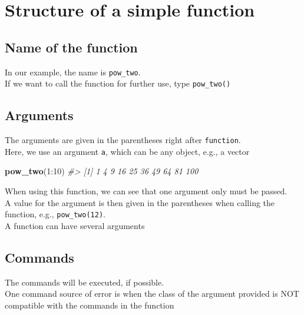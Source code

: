 \documentclass[]{book}
\newenvironment{Shaded}{}{}
\newcommand{\CommentTok}[1]{\textcolor[rgb]{0.38,0.63,0.69}{\textit{#1}}}
\newcommand{\DecValTok}[1]{\textcolor[rgb]{0.25,0.63,0.44}{#1}}
\newcommand{\KeywordTok}[1]{\textcolor[rgb]{0.00,0.44,0.13}{\textbf{#1}}}
\newcommand{\NormalTok}[1]{#1}
\newcommand{\OperatorTok}[1]{\textcolor[rgb]{0.40,0.40,0.40}{#1}}
\theoremstyle{definition}
\theoremstyle{definition}
\theoremstyle{definition}
\theoremstyle{remark}
\begin{document}
\hypertarget{structure-of-a-simple-function}{%
\section{Structure of a simple
function}\label{structure-of-a-simple-function}}

\hypertarget{name-of-the-function}{%
\subsection{Name of the function}\label{name-of-the-function}}

In our example, the name is \texttt{pow\_two}.\\
If we want to call the function for further use, type
\texttt{pow\_two()}

\hypertarget{arguments}{%
\subsection{Arguments}\label{arguments}}

The arguments are given in the parentheses right after
\texttt{function}.\\
Here, we use an argument \texttt{a}, which can be any object, e.g., a
vector

\begin{Shaded}
\begin{Highlighting}[]
\KeywordTok{pow_two}\NormalTok{(}\DecValTok{1}\OperatorTok{:}\DecValTok{10}\NormalTok{)}
\CommentTok{#>  [1]   1   4   9  16  25  36  49  64  81 100}
\end{Highlighting}
\end{Shaded}

When using this function, we can see that one argument only must be
passed.\\
A value for the argument is then given in the parentheses when calling
the function, e.g., \texttt{pow\_two(12)}.\\
A function can have several arguments

\hypertarget{commands}{%
\subsection{Commands}\label{commands}}

The commands will be executed, if possible.\\
One command source of error is when the class of the argument provided
is NOT compatible with the commands in the function
\end{document}
